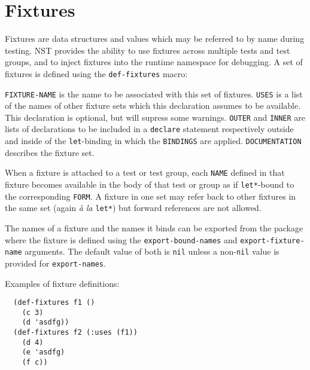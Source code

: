 \section{Fixtures}
\label{fixtures}
Fixtures are data structures and values which may be
referred to by name during testing.  NST provides the ability to use
fixtures across multiple tests and test groups, and to inject fixtures
into the runtime namespace for debugging.
A set of fixtures is defined using the \texttt{def-fixtures}
macro:

%
\texttt{FIXTURE-NAME} is the name to be associated with this set of
fixtures.  \texttt{USES} is a list of the names of other fixture sets
which this declaration assumes to be available.  This declaration is
optional, but will supress some warnings.  \texttt{OUTER} and
\texttt{INNER} are lists of declarations to be included in a
\texttt{declare} statement respectively outside and inside of the
\texttt{let}-binding in which the \texttt{BINDINGS} are applied.
\texttt{DOCUMENTATION} describes the fixture set.

When a fixture is attached to a test or test group, each \texttt{NAME}
defined in that fixture becomes available in the body of that test or
group as if \texttt{let*}-bound to the corresponding \texttt{FORM}.  A
fixture in one set may refer back to other fixtures in the same set
(again \emph{\`a la} \texttt{let*}) but forward references are not
allowed.

The names of a fixture and the names it binds can be exported from the
package where the fixture is defined using the
\texttt{export-bound-names} and \texttt{export-fixture-name}
arguments.  The default value of both is \texttt{nil} unless a
non-\texttt{nil} value is provided for \texttt{export-names}.

Examples of fixture definitions:
\begin{verbatim}
  (def-fixtures f1 ()
    (c 3)
    (d 'asdfg))
  (def-fixtures f2 (:uses (f1))
    (d 4)
    (e 'asdfg)
    (f c))
\end{verbatim}

